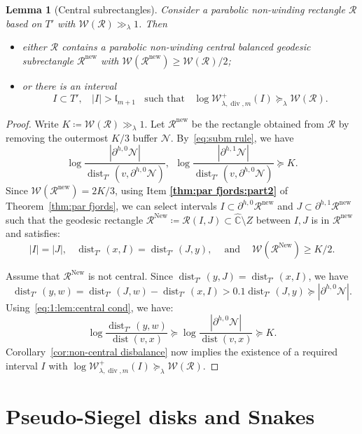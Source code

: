\documentclass{amsart}
\renewcommand{\sp}{{\ \ }}
\newcommand{\1}{{\mathbb 1 }}
\renewcommand{\div}{{\operatorname{div}}}
\newcommand{\Width}{{\mathcal W}}
\newcommand\NN{\mathcal{N}}
\newcommand\RR{\mathcal{R}}
\newcommand{\length}{{\mathfrak l}}
\newcommand\new{{\operatorname{new}}}
\newcommand\New{{\operatorname{New}}}
\newcommand{\wC}{\widehat{\mathbb{C}}}
\newtheorem{lem}[thm]{Lemma}
\theoremstyle{remark}
\numberwithin{equation}{section}
\theoremstyle{definition}
\newcommand{\dist}{\operatorname{dist}}
\begin{document}
\begin{lem}[Central subrectangles]
\label{lem:central cond} Consider a parabolic non-winding rectangle $\RR$ based on $T'$ with $\Width(\RR)\gg_\lambda 1$. Then 
\begin{itemize}
\item either $\RR$ contains a parabolic non-winding central balanced geodesic subrectangle $\RR^\new$ with $\Width(\RR^\new) \ge \Width(\RR)/2$;  
\item or there is an interval 
\begin{equation}
\label{eq:lem:central cond}
I\subset T',\sp\sp   |I|> \length_{m+1} \sp\sp \text{such that}\sp\sp 
\log \Width^{+}_{\lambda,\div, m}(I)\succeq_\lambda \Width(\RR).
\end{equation}
 \end{itemize}
\end{lem}
\begin{proof}
Write $K\coloneqq \Width(\RR)\gg_\lambda 1.$ Let $\RR^\new$ be the rectangle obtained from $\RR$ by removing the outermost $K/3$ buffer $\NN$. By~\eqref{eq:subm rule}, we have
\begin{equation}
\label{eq:1:lem:central cond}
 \log\frac{|\partial^{h,0}\NN|}{\dist_{T'} (v,\partial^{h,0}\NN)}, \sp \log\frac{|\partial^{h,1}\NN|}
{\dist_{T'} (v,\partial^{h,0}\NN)} \succeq K.
\end{equation}
Since $\Width(\RR^\new)=2K/3$, using Item {\bf \ref{thm:par fjords:part2}} of Theorem~\ref{thm:par fjords}, we can select intervals $I\subset \partial^{h,0} \RR^\new$ and  $J\subset \partial^{h,1} \RR^\new$ such that the geodesic rectangle $\RR^\New\coloneqq \RR(I,J)\subset \wC\setminus  Z$ between $I,J$ is in $\RR^\new$ and satisfies:
\[|I|=|J|,\sp\sp \dist_{T'}(x, I)=\dist_{T'}(J,y), \sp\sp\text{ and }\sp\sp \Width (\RR^\New )\ge K/2.\]


Assume that $\RR^\New$ is not central. Since $ \dist_{T'}(y ,J) =\dist_{T'}(x ,I)$, we have
\[\dist_{T'}(y,w)= \dist_{T'}(J,w) - \dist_{T'}(x ,I) >0.1 \dist_{T'}(J,y)\succeq |\partial^{h,0} \NN|.\]
Using~\eqref{eq:1:lem:central cond}, we have:  
\[ \log \frac{\dist_{T'}(y,w)}{\dist(v,x)} \succeq \log \frac{|\partial^{h,0}\NN|}{\dist(v,x)}  \succeq K.\]
Corollary~\ref{cor:non-central disbalance} now implies the existence of a required interval $I$ with $\log \Width^{+}_{\lambda,\div, m}(I)\succeq_\lambda \Width(\RR)$.
\end{proof}
 



\part{Pseudo-Siegel disks and Snakes}
\label{part:psSiegDisk}
\end{document}
